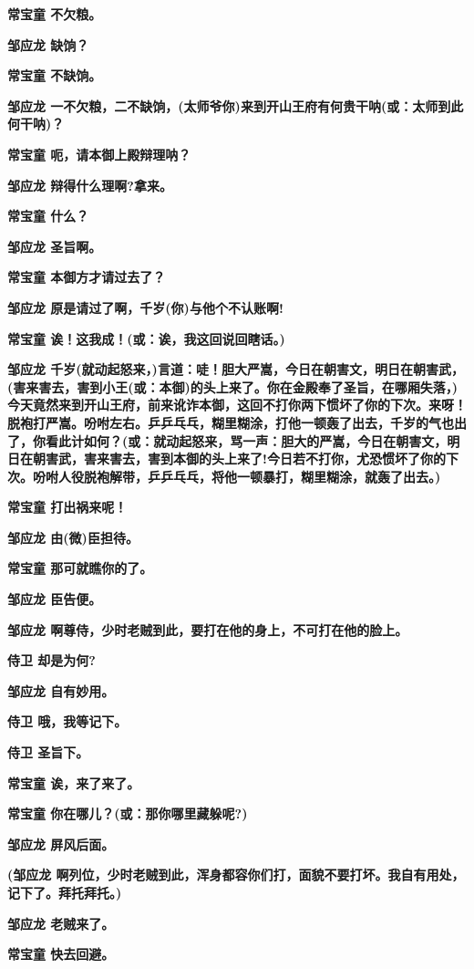 \textbf{常宝童 不欠粮。}

\textbf{邹应龙 缺饷？}

\textbf{常宝童 不缺饷。}

\textbf{邹应龙
一不欠粮，二不缺饷，(太师爷你)来到开山王府有何贵干呐(或：太师到此何干呐)？}

\textbf{常宝童 呃，请本御上殿辩理呐？}

\textbf{邹应龙 辩得什么理啊?拿来。}

\textbf{常宝童 什么？}

\textbf{邹应龙 圣旨啊。}

\textbf{常宝童 本御方才请过去了？}

\textbf{邹应龙 原是请过了啊，千岁(你)与他个不认账啊!}

\textbf{常宝童 诶！这我成！(或：诶，我这回说回瞎话。)}

\textbf{邹应龙
千岁(就动起怒来，)言道：唗！胆大严嵩，今日在朝害文，明日在朝害武，(害来害去，害到小王(或：本御)的头上来了。你在金殿奉了圣旨，在哪厢失落，)今天竟然来到开山王府，前来讹诈本御，这回不打你两下惯坏了你的下次。来呀！脱袍打严嵩。吩咐左右。乒乒乓乓，糊里糊涂，打他一顿轰了出去，千岁的气也出了，你看此计如何？(或：就动起怒来，骂一声：胆大的严嵩，今日在朝害文，明日在朝害武，害来害去，害到本御的头上来了!今日若不打你，尤恐惯坏了你的下次。吩咐人役脱袍解带，乒乒乓乓，将他一顿暴打，糊里糊涂，就轰了出去。)}

\textbf{常宝童 打出祸来呢！}

\textbf{邹应龙 由(微)臣担待。}

\textbf{常宝童 那可就瞧你的了。}

\textbf{邹应龙 臣告便。}

\textbf{邹应龙 啊尊侍，少时老贼到此，要打在他的身上，不可打在他的脸上。}

\textbf{侍卫 却是为何?}

\textbf{邹应龙 自有妙用。}

\textbf{侍卫 哦，我等记下。}

\textbf{侍卫 圣旨下。}

\textbf{常宝童 诶，来了来了。}

\textbf{常宝童 你在哪儿？(或：那你哪里藏躲呢?)}

\textbf{邹应龙 屏风后面。}

\textbf{(邹应龙
啊列位，少时老贼到此，浑身都容你们打，面貌不要打坏。我自有用处，记下了。拜托拜托。)}

\textbf{邹应龙 老贼来了。}

\textbf{常宝童 快去回避。}

